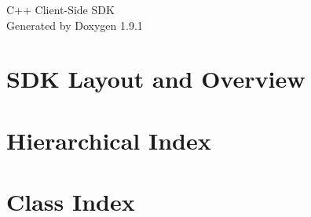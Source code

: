 \let\mypdfximage\pdfximage\def\pdfximage{\immediate\mypdfximage}\documentclass[twoside]{book}
\newcommand{\+}{\discretionary{\mbox{\scriptsize$\hookleftarrow$}}{}{}}
\newcommand{\clearemptydoublepage}{%
  \newpage{\pagestyle{empty}\cleardoublepage}%
}
\begin{document}
\raggedbottom

\hypersetup{pageanchor=false,
             bookmarksnumbered=true,
             pdfencoding=unicode
            }
\begin{titlepage}
\vspace*{7cm}
\begin{center}%
{\Large C++ Client-\/\+Side SDK }\\
\vspace*{1cm}
{\large Generated by Doxygen 1.9.1}\\
\end{center}
\end{titlepage}
\clearemptydoublepage
{}
\tableofcontents
\clearemptydoublepage
{}
\hypersetup{pageanchor=true}

\chapter{SDK Layout and Overview}
\label{index}\hypertarget{index}{}
\chapter{Hierarchical Index}

\chapter{Class Index}

\end{document}
